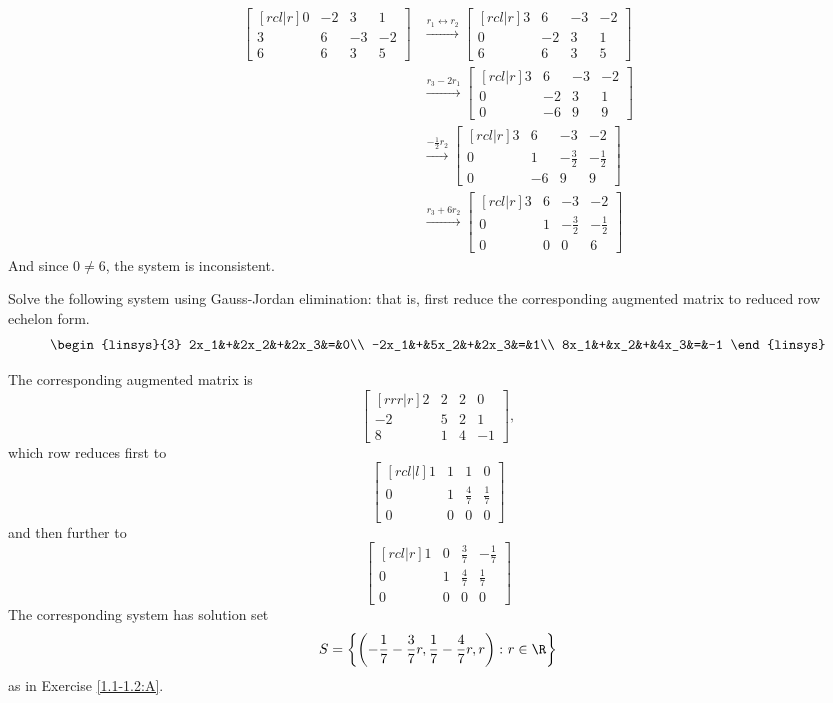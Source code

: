 
\ \\
\begin{solution}
\begin{align*}
\begin{bmatrix}[rcl|r]
0&-2&3&1\\
3&6&-3&-2\\
6&6&3&5
\end{bmatrix}
&\xrightarrow[]{r_1 \leftrightarrow r_2}
\begin{bmatrix}[rcl|r]
3&6&-3&-2\\
0&-2&3&1\\
6&6&3&5
\end{bmatrix}
\\
&\xrightarrow[]{r_3-2r_1}
\begin{bmatrix}[rcl|r]
3&6&-3&-2\\
0&-2&3&1\\
0&-6&9&9
\end{bmatrix}\\
&\xrightarrow[]{-\frac{1}{2}r_2}
\begin{bmatrix}[rcl|r]
3&6&-3&-2\\
0&1&-\frac{3}{2}&-\frac{1}{2}\\
0&-6&9&9
\end{bmatrix}\\
&\xrightarrow[]{r_3+6r_2}
\begin{bmatrix}[rcl|r]
3&6&-3&-2\\
0&1&-\frac{3}{2}&-\frac{1}{2}\\
0&0&0&6
\end{bmatrix}
\end{align*}
And since $0 \neq 6$, the system is inconsistent.
\end{solution}
\ii 
Solve the following system using  Gauss-Jordan elimination: that is, first reduce the corresponding augmented matrix to reduced row echelon form. 
\[
\begin{linsys}{3}
2x_1&+&2x_2&+&2x_3&=&0\\
-2x_1&+&5x_2&+&2x_3&=&1\\
8x_1&+&x_2&+&4x_3&=&-1
\end{linsys}
\]
\noindent
\begin{solution}
\noindent The corresponding augmented matrix is 
\[
\begin{bmatrix}[rrr|r]
2&2&2&0\\
-2&5&2&1\\
8&1&4&-1
\end{bmatrix},
\]
which row reduces first to 
\[
\begin{bmatrix}[rcl|l]
1&1&1&0\\
0&1&\frac{4}{7}&\frac{1}{7}\\
0&0&0&0
\end{bmatrix}
\]
and then further to 
\[
\begin{bmatrix}[rcl|r]
1&0&\frac{3}{7}&-\frac{1}{7}\\[1ex]
0&1&\frac{4}{7}&\frac{1}{7}\\[1ex]
0&0&0&0
\end{bmatrix}
\]
The corresponding system has solution set 
\[
S=\left\{\left(-\frac{1}{7}-\frac{3}{7}r,\frac{1}{7}-\frac{4}{7}r ,r\right)\colon r\in \R\right\}
\]
as in Exercise \ref{1.1-1.2:A}.
\end{solution}
